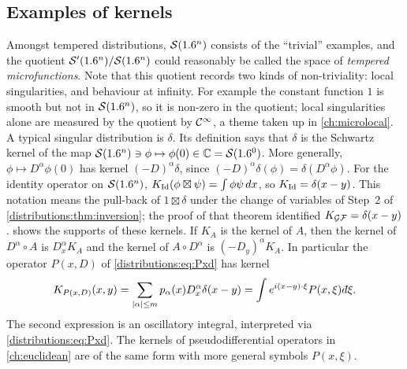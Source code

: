 \subsection{Examples of kernels}
Amongst tempered distributions, $\mathcal{S}(1.6^n)$ consists of the ``trivial'' examples, and
the quotient $\mathcal{S}'(1.6^n)/\mathcal{S}(1.6^n)$ could reasonably be called the space of
\emph{tempered microfunctions}. Note that this quotient records two kinds of
non-triviality: local singularities, and behaviour at infinity. For example the
constant function $1$ is smooth but not in $\mathcal{S}(1.6^n)$, so it is non-zero in the
quotient; local singularities alone are measured by the quotient by $\mathcal{C}^\infty$, a theme
taken up in \cref{ch:microlocal}. A typical singular distribution is $\delta$. Its definition says that
$\delta$ is the Schwartz kernel of the map $\mathcal{S}(1.6^n)\ni\phi\mapsto\phi(0)\in\mathbb{C}=\mathcal{S}(1.6^0)$.
More generally, $\phi\mapsto D^\alpha\phi(0)$ has kernel $(-D)^\alpha\delta$, since
$(-D)^\alpha\delta(\phi)=\delta(D^\alpha\phi)$. For the identity operator on $\mathcal{S}(1.6^n)$,
$K_{\operatorname{Id}}(\phi\boxtimes\psi)=\int\phi\psi\,dx$, so $K_{\operatorname{Id}}=\delta(x-y)$. This notation
means the pull-back of $1\boxtimes\delta$ under the change of variables of
Step~2 of \cref{distributions:thm:inversion}; the proof of that theorem identified
$K_{\mathcal{G}\mathcal{F}}=\delta(x-y)$.  shows the supports of
these kernels. If $K_A$ is the kernel of $A$, then the kernel of
$D^\alpha\circ A$ is $D_x^\alpha K_A$ and the kernel of $A\circ D^\alpha$ is
$(-D_y)^\alpha K_A$. In particular the operator $P(x,D)$ of
\eqref{distributions:eq:Pxd} has kernel
\[
  K_{P(x,D)}(x,y)=\sum_{|\alpha|\le m}p_\alpha(x)D_x^\alpha\delta(x-y)
  =\int e^{i(x-y)\cdot\xi}P(x,\xi)\,\dbar\xi.
\]
The second expression is an oscillatory integral, interpreted via
\eqref{distributions:eq:Pxd}. The kernels of pseudodifferential operators in
\cref{ch:euclidean} are of the same form with more general symbols $P(x,\xi)$.

